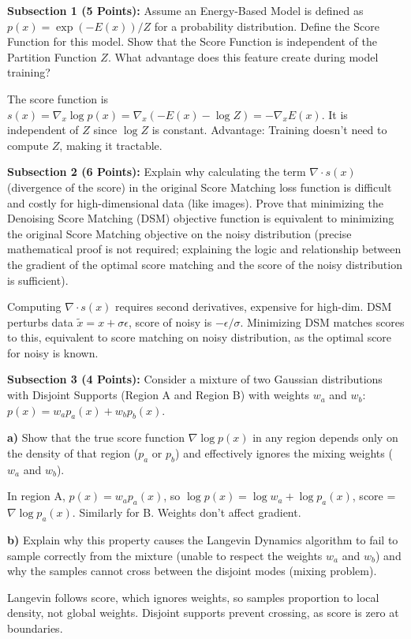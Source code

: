 \documentclass[a4paper,12pt]{article}
\begin{document}
\textbf{Subsection 1 (5 Points):} Assume an Energy-Based Model is defined as $p(x) = \exp(-E(x))/Z$ for a probability distribution. Define the Score Function for this model. Show that the Score Function is independent of the Partition Function $Z$. What advantage does this feature create during model training?

The score function is $s(x) = \nabla_x \log p(x) = \nabla_x ( -E(x) - \log Z ) = - \nabla_x E(x)$. It is independent of $Z$ since $\log Z$ is constant. Advantage: Training doesn't need to compute $Z$, making it tractable.

\textbf{Subsection 2 (6 Points):} Explain why calculating the term $\nabla \cdot s(x)$ (divergence of the score) in the original Score Matching loss function is difficult and costly for high-dimensional data (like images). Prove that minimizing the Denoising Score Matching (DSM) objective function is equivalent to minimizing the original Score Matching objective on the noisy distribution (precise mathematical proof is not required; explaining the logic and relationship between the gradient of the optimal score matching and the score of the noisy distribution is sufficient).

Computing $\nabla \cdot s(x)$ requires second derivatives, expensive for high-dim. DSM perturbs data $\tilde{x} = x + \sigma \epsilon$, score of noisy is $- \epsilon / \sigma$. Minimizing DSM matches scores to this, equivalent to score matching on noisy distribution, as the optimal score for noisy is known.

\textbf{Subsection 3 (4 Points):} Consider a mixture of two Gaussian distributions with Disjoint Supports (Region A and Region B) with weights $w_a$ and $w_b$: $p(x) = w_a p_a(x) + w_b p_b(x)$.

\textbf{a)} Show that the true score function $\nabla \log p(x)$ in any region depends only on the density of that region ($p_a$ or $p_b$) and effectively ignores the mixing weights ($w_a$ and $w_b$).

In region A, $p(x) = w_a p_a(x)$, so $\log p(x) = \log w_a + \log p_a(x)$, score = $\nabla \log p_a(x)$. Similarly for B. Weights don't affect gradient.

\textbf{b)} Explain why this property causes the Langevin Dynamics algorithm to fail to sample correctly from the mixture (unable to respect the weights $w_a$ and $w_b$) and why the samples cannot cross between the disjoint modes (mixing problem).

Langevin follows score, which ignores weights, so samples proportion to local density, not global weights. Disjoint supports prevent crossing, as score is zero at boundaries.
\end{document}
